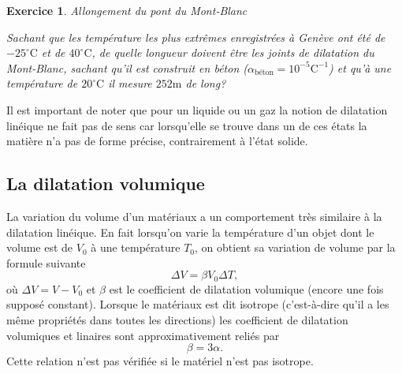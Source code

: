 \documentclass[a4paper,12pt]{book}
\newtheorem{exercice}{Exercice}
\newcommand{\m}{\mathrm{m}}
\newcommand{\C}{\mathrm{C}}
\begin{document}
\begin{exercice}{Allongement du pont du Mont-Blanc}

Sachant que les température les plus extrêmes enregistrées à Genève ont été de $-25^\circ\C$ et de $40^\circ\C$, de quelle longueur doivent être les joints de dilatation du Mont-Blanc, sachant qu'il est construit en béton ($\alpha_{\mbox{béton}}=10^{-5}\C^{-1}$) et qu'à une température de $20^\circ\C$ il mesure $252\m$ de long?
\end{exercice}

Il est important de noter que pour un liquide ou un gaz 
la notion de dilatation linéique ne fait pas de sens car lorsqu'elle se trouve dans un de ces états la matière n'a pas de forme précise, contrairement à l'état solide.

\subsection{La dilatation volumique}

La variation du volume d'un matériaux a un comportement très similaire à la dilatation linéique. En fait lorsqu'on varie 
la température d'un objet dont le volume est de $V_0$ à une température $T_0$, on obtient sa variation de volume par la formule suivante
\begin{equation}
\Delta V=\beta V_0\Delta T,
\end{equation}
où $\Delta V=V-V_0$ et $\beta$ est le coefficient de dilatation volumique (encore une fois supposé constant). Lorsque le matériaux est dit isotrope (c'est-à-dire qu'il a les même propriétés dans toutes les directions) les coefficient de dilatation volumiques et linaires sont approximativement reliés par
\begin{equation}%
\beta=3\alpha.
\end{equation}
Cette relation n'est pas vérifiée si le matériel n'est pas isotrope.
\end{document}
